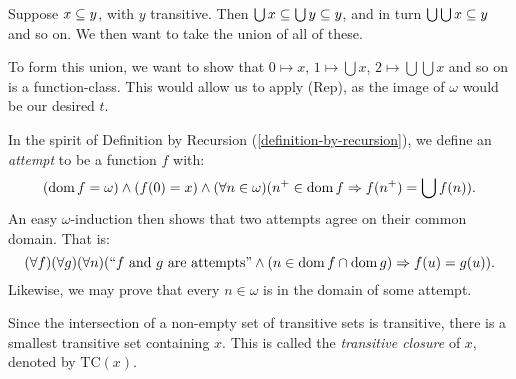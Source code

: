 \documentclass{article}
\begin{document}
\begin{prf}
    Suppose $x \subseteq y$, with $y$ transitive. Then $\bigcup x \subseteq \bigcup y \subseteq y$, and in turn $\bigcup \bigcup x \subseteq y$ and so on. We then want to take the union of all of these.
    
    To form this union, we want to show that $0 \mapsto x$, $1 \mapsto \bigcup x$, $2 \mapsto \bigcup\bigcup x$ and so on is a function-class. This would allow us to apply (Rep), as the image of $\omega$ would be our desired $t$.
    
    In the spirit of Definition by Recursion (\ref{definition-by-recursion}), we define an \textit{attempt} to be a function $f$ with:
    \[
	(\operatorname{dom} f = \omega)
	\land
	(f(0) = x)
	\land
	(\forall n \in \omega)
	(n^+ \in \operatorname{dom} f \Rightarrow f(n^+) = \bigcup f(n)).
	\]
	An easy $\omega$-induction then shows that two attempts agree on their common domain. That is:
	\[
	(\forall f)(\forall g)(\forall n)
	(``f \text{ and } g \text{ are attempts}" \land (n \in \operatorname{dom} f \cap \operatorname{dom} g) \Rightarrow f(u) = g(u)).
	\]	
	Likewise, we may prove that every $n \in \omega$ is in the domain of some attempt.
\end{prf}

\begin{corollary}
    Since the intersection of a non-empty set of transitive sets is transitive, there is a smallest transitive set containing $x$. This is called the \textit{transitive closure} of $x$, denoted by $\mathrm{TC}(x)$.
\end{corollary}
\end{document}
